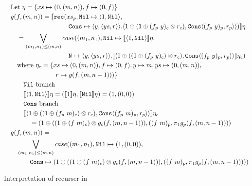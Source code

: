 \begin{figure}
  \label{fig:ws_map_interpretation}
  \caption{Interpretation of recurser in }
  \[\begin{split}
      &\quad \text{Let } \eta = \{ xs \mapsto (0, (m, n)), f \mapsto (0, f)\}\\
      &\quad g(f, (m, n)) = \llbracket \texttt{rec}(xs_p, \texttt{Nil} \mapsto \langle 1, \texttt{Nil}\rangle,\\
      &\qquad\quad\quad\quad\qquad\quad\quad\quad \texttt{Cons} \mapsto \langle y, \langle ys, r \rangle \rangle . \langle 1 \oplus (1 \oplus (f_p\ y)_c \otimes r_c), \texttt{Cons}\langle (f_p\ y)_p, r_p\rangle\rangle) \rrbracket \eta\\
      &\qquad = \bigvee\limits_{(m_1, n_1) \leq (m, n)} case((m_1, n_1), \texttt{Nil} \mapsto \llbracket \langle 1, \texttt{Nil} \rangle \rrbracket \eta, \\
      &\qquad\quad\quad\quad\qquad\quad\quad\quad \texttt{N} \mapsto \langle y, \langle ys, r \rangle \rangle . \llbracket \langle 1 \oplus ((1 \oplus (f_p\ y)_c) \otimes r_c), \texttt{Cons} \langle (f_p\ y)_p, r_p \rangle \rangle \rrbracket \eta_c) \\
      &\qquad \text{where } \eta_c = \{xs \mapsto (0, (m, n)), f \mapsto (0, f), y \mapsto m, ys \mapsto (0, (m, n)), \\
      &\qquad\quad\quad\quad\quad\quad\quad r \mapsto g(f, (m, n-1)))\} \\
      &\qquad\quad \text{\texttt{Nil} branch} \\
      &\qquad\quad \llbracket \langle 1, \texttt{Nil} \rangle \rrbracket \eta = (\llbracket 1 \rrbracket \eta , \llbracket \texttt{Nil} \rrbracket \eta) = (1, (0, 0)) \\
      &\qquad\quad \text{\texttt{Cons} branch} \\
      &\qquad\quad  \llbracket \langle 1 \oplus ((1 \oplus (f_p\ m)_c) \otimes r_c), \texttt{Cons} \langle (f_p\ m)_p, r_p \rangle \rangle \rrbracket \eta_c \\
      &\qquad\quad\quad = (1 \oplus ((1 \oplus (f\ m)_c) \otimes g_c(f, (m, n-1))), ((f\ m)_p, \pi_1 g_p(f, (m, n-1)))) \\
      &\quad g(f, (m, n)) = \\
      &\qquad \bigvee\limits_{(m_1, n_1) \leq (m, n)} case((m_1, n_1), \texttt{Nil} \mapsto (1, (0, 0)), \\
      &\qquad\quad\quad \texttt{Cons} \mapsto (1 \oplus ((1 \oplus (f\ m)_c) \otimes g_c(f, (m, n-1))), ((f\ m)_p, \pi_1 g_p(f, (m, n-1)))))
  \end{split}\]
\end{figure}

